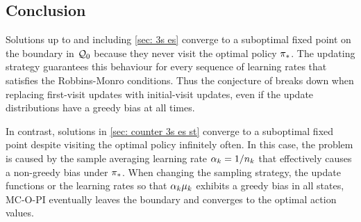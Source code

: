 

\subsection{Conclusion}

\vspace{-0.2cm}

Solutions up to and including \autoref{sec: 3s es} converge to a suboptimal fixed point on the boundary in $\mathcal{Q}_0$ because they never visit the optimal policy ${\pi}_*$.
The updating strategy guarantees this behaviour for every sequence of learning rates that satisfies the Robbins-Monro conditions.
Thus the conjecture of \citet[p.~99]{Sutton2018ReinforcementIntroduction} breaks down when replacing first-visit updates with initial-visit updates, even if the update distributions have a greedy bias at all times.

In contrast, solutions in \autoref{sec: counter 3s es st} converge to a suboptimal fixed point despite visiting the optimal policy infinitely often.
In this case, the problem is caused by the sample averaging learning rate $\alpha_k = 1/n_k$ that effectively causes a non-greedy bias under ${\pi}_*$.
When changing the sampling strategy, the update functions or the learning rates so that $\alpha_k \mu_k$ exhibits a greedy bias in all states, MC-O-PI eventually 
leaves the boundary and converges to the optimal action values.


